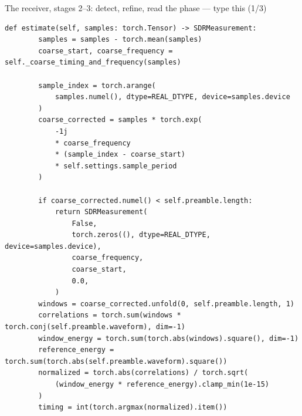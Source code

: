 \documentclass[10pt]{beamer}
\begin{document}
\begin{frame}[fragile]{The receiver, stages 2--3: detect, refine, read the phase --- type this (1/3)}
\begin{lstlisting}[basicstyle=\ttfamily\tiny]
    def estimate(self, samples: torch.Tensor) -> SDRMeasurement:
        samples = samples - torch.mean(samples)
        coarse_start, coarse_frequency = self._coarse_timing_and_frequency(samples)

        sample_index = torch.arange(
            samples.numel(), dtype=REAL_DTYPE, device=samples.device
        )
        coarse_corrected = samples * torch.exp(
            -1j
            * coarse_frequency
            * (sample_index - coarse_start)
            * self.settings.sample_period
        )

        if coarse_corrected.numel() < self.preamble.length:
            return SDRMeasurement(
                False,
                torch.zeros((), dtype=REAL_DTYPE, device=samples.device),
                coarse_frequency,
                coarse_start,
                0.0,
            )
        windows = coarse_corrected.unfold(0, self.preamble.length, 1)
        correlations = torch.sum(windows * torch.conj(self.preamble.waveform), dim=-1)
        window_energy = torch.sum(torch.abs(windows).square(), dim=-1)
        reference_energy = torch.sum(torch.abs(self.preamble.waveform).square())
        normalized = torch.abs(correlations) / torch.sqrt(
            (window_energy * reference_energy).clamp_min(1e-15)
        )
        timing = int(torch.argmax(normalized).item())
\end{lstlisting}
\end{frame}
\end{document}
